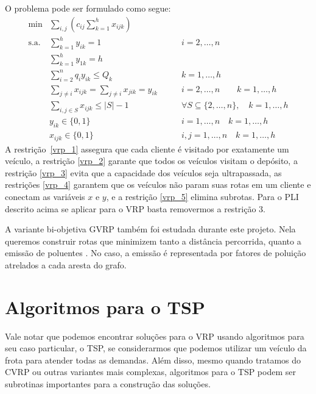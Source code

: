 \documentclass[12pt, a4paper]{article}
\begin{document}
O problema pode ser formulado como segue:
\begin{align}
\min & \sum\limits_{i,j}\left(c_{ij}\sum\limits_{k=1}^{h}x_{ijk}\right) & \nonumber \\
%
\text{s.a.} & \sum\limits_{k=1}^{h}y_{ik}=1 & \qquad i=2,\dots,n \label{vrp_1}\\
%
& \sum\limits_{k=1}^{h}y_{1k} = h & \label{vrp_2}\\
%
& \sum\limits_{i=2}^{n}q_{i} y_{ik} \leqslant Q_{k} & \qquad k=1,\dots,h \label{vrp_3}\\
%
& \sum\limits_{j\neq i}x_{ijk} = \sum\limits_{j\neq i}x_{jik} = y_{ik} & \qquad i=2,\dots,n \qquad k=1,\dots,h \label{vrp_4}\\
%
& \sum\limits_{i,j \in S}x_{ijk} \leqslant |S|-1 & \qquad \forall S\subseteq\lbrace2,\dots,n\rbrace ,\quad k=1,\dots,h \label{vrp_5}\\
%
& y_{ik} \in \lbrace 0,1 \rbrace & \qquad i=1,\dots,n \quad k=1,\dots,h \label{vrp_6}\\
%
& x_{ijk} \in \lbrace 0,1 \rbrace & \qquad i,j=1,\dots,n \quad k=1,\dots,h \label{vrp_7}
\end{align}
%
A restrição~\eqref{vrp_1} assegura que cada cliente é visitado por exatamente um veículo, a restrição \eqref{vrp_2} garante que todos os veículos visitam o depósito, a restrição \eqref{vrp_3} evita que a capacidade dos veículos seja ultrapassada, as restrições \eqref{vrp_4} garantem que os veículos não param suas rotas em um cliente e conectam as variáveis $x$ e $y$, e a restrição \eqref{vrp_5} elimina subrotas.
Para o PLI descrito acima se aplicar para o VRP basta removermos a restrição 3.

A variante bi-objetiva GVRP também foi estudada durante este projeto. Nela queremos construir rotas que minimizem tanto a distância percorrida, quanto a emissão de poluentes \cite{jemai2012nsga}. No caso, a emissão é representada por fatores de poluição atrelados a cada aresta do grafo.


\section{Algoritmos para o TSP}\label{sec:algorithms_TSP}

Vale notar que podemos encontrar soluções para o VRP usando algoritmos para seu caso particular, o TSP, se considerarmos que podemos utilizar um veículo da frota para atender todas as demandas.  Além disso, mesmo quando tratamos do CVRP ou outras variantes mais complexas, algoritmos para o TSP podem ser subrotinas importantes para a construção das soluções.
\end{document}
